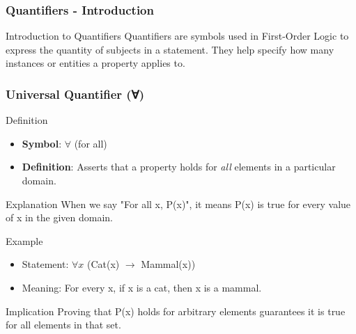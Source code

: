 \documentclass[aspectratio=169]{beamer}
\begin{document}
\begin{frame}[fragile]
    \frametitle{Quantifiers - Introduction}
    \begin{block}{Introduction to Quantifiers}
        Quantifiers are symbols used in First-Order Logic to express the quantity of subjects in a statement.
        They help specify how many instances or entities a property applies to.
    \end{block}
\end{frame}

\begin{frame}[fragile]
    \frametitle{Universal Quantifier (∀)}
    \begin{block}{Definition}
        \begin{itemize}
            \item \textbf{Symbol}: $\forall$ (for all)
            \item \textbf{Definition}: Asserts that a property holds for \textit{all} elements in a particular domain.
        \end{itemize}
    \end{block}
    
    \begin{block}{Explanation}
        When we say "For all x, P(x)", it means P(x) is true for every value of x in the given domain.
    \end{block}

    \begin{block}{Example}
        \begin{itemize}
            \item Statement: $\forall x$ (Cat(x) $\rightarrow$ Mammal(x))
            \item Meaning: For every x, if x is a cat, then x is a mammal.
        \end{itemize}
    \end{block}
    
    \begin{block}{Implication}
        Proving that P(x) holds for arbitrary elements guarantees it is true for all elements in that set.
    \end{block}
\end{frame}
\end{document}
